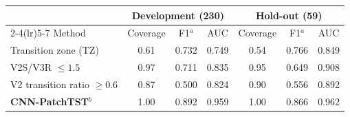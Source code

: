 \begin{tabular}{lcccccc}
\toprule
 & \multicolumn{3}{c}{Development (230)} & \multicolumn{3}{c}{Hold-out (59)} \\
\cmidrule(lr){2-4}\cmidrule(lr){5-7}
Method & Coverage & F1$^{a}$ & AUC & Coverage & F1$^{a}$ & AUC \\
\midrule
Transition zone (TZ) & 0.61 & 0.732 & 0.749 & 0.54 & 0.766 & 0.849 \\
V2S/V3R $\leq 1.5$ & 0.97 & 0.711 & 0.835 & 0.95 & 0.649 & 0.908 \\
V2 transition ratio $\geq 0.6$ & 0.87 & 0.500 & 0.824 & 0.90 & 0.556 & 0.892 \\
\textbf{CNN-PatchTST}$^{b}$ & 1.00 & 0.892 & 0.959 & 1.00 & 0.866 & 0.962 \\
\bottomrule
\end{tabular}

